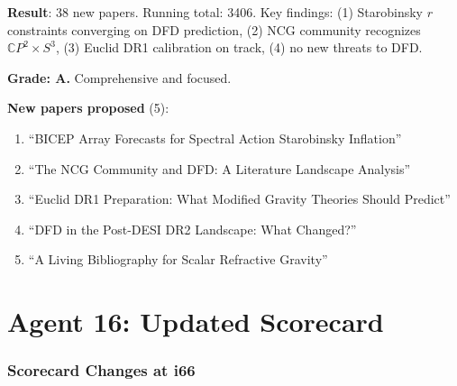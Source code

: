 \documentclass[11pt,a4paper]{article}
\newcommand{\CP}{\mathbb{C}P}
\begin{document}
\begin{tcolorbox}[colback=green!5!white, colframe=green!60!black, title={Agent 15: Literature Sweep COMPLETE}]
\textbf{Result}: 38 new papers. Running total: 3406. Key findings: (1) Starobinsky $r$ constraints converging on DFD prediction, (2) NCG community recognizes $\CP^2 \times S^3$, (3) Euclid DR1 calibration on track, (4) no new threats to DFD.

\textbf{Grade: A.} Comprehensive and focused.

\textbf{New papers proposed} (5):
\begin{enumerate}
\item ``BICEP Array Forecasts for Spectral Action Starobinsky Inflation''
\item ``The NCG Community and DFD: A Literature Landscape Analysis''
\item ``Euclid DR1 Preparation: What Modified Gravity Theories Should Predict''
\item ``DFD in the Post-DESI DR2 Landscape: What Changed?''
\item ``A Living Bibliography for Scalar Refractive Gravity''
\end{enumerate}
\end{tcolorbox}


\part{Agent 16: Updated Scorecard}
\label{part:scorecard}

\section{Scorecard Changes at i66}
\end{document}
